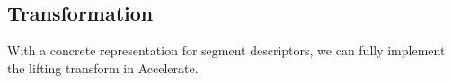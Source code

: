 %


\subsection{Transformation}
With a concrete representation for segment descriptors, we can fully implement the lifting transform in Accelerate.

